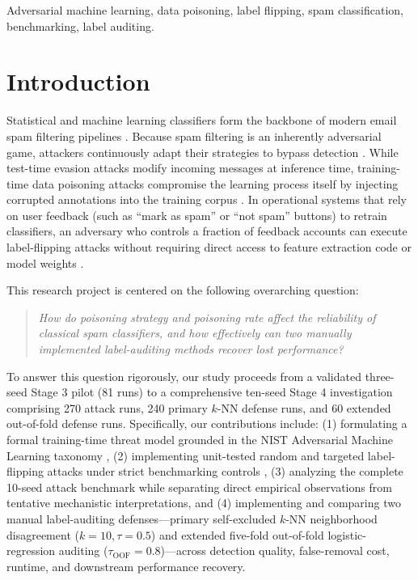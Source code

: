 \documentclass[10pt,conference]{IEEEtran}
\begin{document}
\begin{IEEEkeywords}
Adversarial machine learning, data poisoning, label flipping, spam classification, benchmarking, label auditing.
\end{IEEEkeywords}

\section{Introduction}
Statistical and machine learning classifiers form the backbone of modern email spam filtering pipelines \cite{nelson2008exploiting}. Because spam filtering is an inherently adversarial game, attackers continuously adapt their strategies to bypass detection \cite{barreno2010security}. While test-time evasion attacks modify incoming messages at inference time, training-time data poisoning attacks compromise the learning process itself by injecting corrupted annotations into the training corpus \cite{biggio2012poisoning}. In operational systems that rely on user feedback (such as ``mark as spam'' or ``not spam'' buttons) to retrain classifiers, an adversary who controls a fraction of feedback accounts can execute label-flipping attacks without requiring direct access to feature extraction code or model weights \cite{nist2024adversarial}.

This research project is centered on the following overarching question:
\begin{quote}
\textit{How do poisoning strategy and poisoning rate affect the reliability of classical spam classifiers, and how effectively can two manually implemented label-auditing methods recover lost performance?}
\end{quote}

To answer this question rigorously, our study proceeds from a validated three-seed Stage 3 pilot (81 runs) to a comprehensive ten-seed Stage 4 investigation comprising 270 attack runs, 240 primary $k$-NN defense runs, and 60 extended out-of-fold defense runs. Specifically, our contributions include: (1) formulating a formal training-time threat model grounded in the NIST Adversarial Machine Learning taxonomy \cite{nist2024adversarial}, (2) implementing unit-tested random and targeted label-flipping attacks under strict benchmarking controls \cite{schwarzschild2021just}, (3) analyzing the complete 10-seed attack benchmark while separating direct empirical observations from tentative mechanistic interpretations, and (4) implementing and comparing two manual label-auditing defenses---primary self-excluded $k$-NN neighborhood disagreement ($k=10, \tau=0.5$) and extended five-fold out-of-fold logistic-regression auditing ($\tau_{\text{OOF}}=0.8$)---across detection quality, false-removal cost, runtime, and downstream performance recovery.
\end{document}
